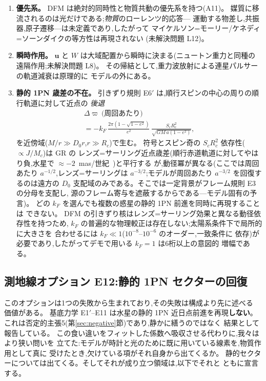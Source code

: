 \documentclass[a4paper,10pt,twocolumn]{ltjsarticle}
\newcommand{\vect}[1]{\bm{#1}}
\newcommand{\Dz}{D_0}
\begin{document}
\begin{enumerate}
\item {\bf 優先系。}
DFM は絶対的同時性と物質共動の優先系を持つ(A11)。
媒質に移流されるのは光だけである;\emph{物質}のローレンツ的応答---
運動する物差し,共振器,原子遷移---は未定義であり,したがって
マイケルソン=モーリー/ケネディ=ソーンダイクの等方性は再現されない
(未解決問題 L12)。

\item {\bf 瞬時作用。}
$\vect{u}$ と $W$ は大域配置から瞬時に決まる(ニュートン重力と同種の
遠隔作用;未解決問題 L8)。
その帰結として,重力波放射による連星パルサーの軌道減衰は原理的に
モデルの外にある。

\item {\bf 静的 1PN 歳差の不在。}
引きずり規則 E6$'$ は,順行スピンの中心の周りの順行軌道に対して近点の
\emph{後退}
\begin{multline}
\Delta\varpi\ \text{(周回あたり)}\\
 = -k_F\,\frac{2\pi\left(1-\sqrt{1-e^2}\right)}{e^2}\,
 \frac{S_cR_c^2}{\sqrt{GM\,a(1-e^2)}},
\label{eq:prec}
\end{multline}
を近傍域($M/r \gg \Dz r$,$r \gg R_c$)で生む。
符号とスピン奇の $S_cR_c^2$ 依存性($\propto J/M_c$)は GR の
レンズ=サーリング近点歳差(順行赤道軌道に対してやはり負,水星で
$\approx -2$~mas/世紀~\cite{IorioMercury2011,IorioEtAl2011})と平行する
が,動径冪が異なる(ここでは周回あたり $a^{-1/2}$,レンズ=サーリングは
$a^{-3/2}$;モデルが周回あたり $a^{-3/2}$ を回復するのは遠方の $\Dz$
支配域のみである。そこでは一定背景がフレーム規則 E3 の分母を支配し,
源のフレーム寄与を遮蔽するからである---モデル固有の予言)。
どの $k_F$ を選んでも複数の惑星の静的 1PN 前進を同時に再現することは
できない。
DFM の引きずり核はレンズ=サーリング効果と異なる動径依存性を持つため,
$k_F$ の普遍的な物理較正は存在しない;太陽系条件下で局所的に大きさを
合わせるには $k_F \ll 1$($10^{-8}$--$10^{-6}$ のオーダー,一致条件に
依存)が必要であり,したがってデモで用いる $k_F = 1$ は6桁以上の意図的
増幅である。
\end{enumerate}

\subsection{測地線オプション E12:静的 1PN セクターの回復}
\label{sec:e12}

このオプションは1つの失敗から生まれており,その失敗は構成より先に述べる
価値がある。
基底力学 E1$'$--E11 は水星の静的 1PN 近日点前進を再現\textbf{しない}。
これは否定的主張5(第\ref{sec:negative}節)であり,静かに繕うのではなく
結果として報告している。
この食い違いをフィットした係数へ吸収させる代わりに,我々はより狭い問いを
立てた:モデルが時計と光のために既に用いている線素を,物質作用として真に
受けたとき,欠けている項がそれ自身から出てくるか。
静的セクターについては出てくる。そしてそれが成り立つ領域は,以下でそれと
ともに宣言する。
\end{document}
